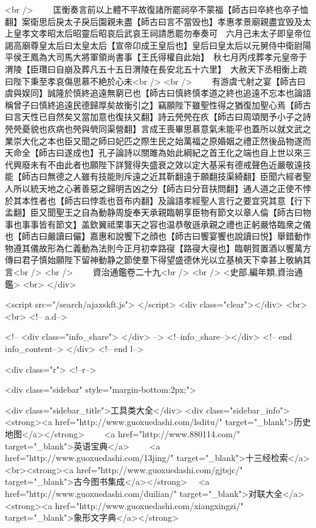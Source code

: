 <br />
　　匡衡奏言前以上體不平故復諸所罷祠卒不蒙福【師古曰卒終也卒子恤翻】案衛思后戾太子戾后園親未盡【師古曰言不當毁也】孝惠孝景廟親盡宜毁及太上皇孝文孝昭太后昭靈后昭哀后武哀王祠請悉罷勿奉奏可　六月己未太子即皇帝位謁高廟尊皇太后曰太皇太后【宣帝卬成王皇后也】皇后曰皇太后以元舅侍中衛尉陽平侯王鳳為大司馬大將軍領尚書事【王氏得權自此始】　秋七月丙戌葬孝元皇帝于渭陵【臣瓚曰自崩及葬凡五十五日渭陵在長安北五十六里】　大赦天下丞相衡上疏曰陛下秉至孝哀傷思慕不絶於心未<br />
<br />
　　有游虞弋射之宴【師古曰虞與娱同】誠隆於慎終追遠無窮已也【師古曰慎終慎孝道之終也追遠不忘本也論語稱曾子曰慎終追遠民德歸厚矣故衡引之】竊願陛下雖聖性得之猶復加聖心焉【師古曰言天性已自然矣又當加意也復扶又翻】詩云焭焭在疚【師古曰周頌閔予小子之詩焭焭憂貌也疚病也焭與煢同渠營翻】言成王喪畢思慕意氣未能平也蓋所以就文武之業崇大化之本也臣又聞之師曰妃匹之際生民之始萬福之原婚姻之禮正然後品物遂而天命全【師古曰遂成也】孔子論詩以關雎為始此綱紀之首王化之端也自上世以來三代興廢未有不由此者也願陛下詳覽得失盛衰之效以定大基采有德戒聲色近嚴敬遠技能【師古曰無德之人雖有技能則斥遠之近其靳翻遠于願翻技渠綺翻】臣聞六經者聖人所以統天地之心著善惡之歸明吉凶之分【師古曰分音扶問翻】通人道之正使不悖於其本性者也【師古曰悖乖也音布内翻】及論語孝經聖人言行之要宜究其意【行下孟翻】臣又聞聖王之自為動静周旋奉天承親臨朝享臣物有節文以章人倫【師古曰物事也事事皆有節文】盖欽翼祗栗事天之容也温恭敬遜承親之禮也正躬嚴恪臨衆之儀也【師古曰嚴讀曰儼】嘉惠和說饗下之顔也【師古曰饗宴饗也說讀曰悦】舉錯動作物遵其儀故形為仁義動為法則今正月初幸路寑【路寑大寑也】臨朝賀置酒以饗萬方傳曰君子慎始願陛下留神動静之節使羣下得望盛德休光以立基楨天下幸甚上敬納其言<br />
<br />
　　資治通鑑卷二十九<br />
<br />
<史部,編年類,資治通鑑>  <br>
   </div> 

<script src="/search/ajaxskft.js"> </script>
 <div class="clear"></div>
<br>
<br>
 <!-- a.d-->

 <!--
<div class="info_share">
</div> 
-->
 <!--info_share--></div>   <!-- end info_content-->
  </div> <!-- end l-->

<div class="r">   <!--r-->



<div class="sidebar"  style="margin-bottom:2px;">

 
<div class="sidebar_title">工具类大全</div>
<div class="sidebar_info">
<strong><a href="http://www.guoxuedashi.com/lsditu/" target="_blank">历史地图</a></strong>　　
<a href="http://www.880114.com/" target="_blank">英语宝典</a>　　
<a href="http://www.guoxuedashi.com/13jing/" target="_blank">十三经检索</a>　
<br><strong><a href="http://www.guoxuedashi.com/gjtsjc/" target="_blank">古今图书集成</a></strong>　
<a href="http://www.guoxuedashi.com/duilian/" target="_blank">对联大全</a>　<strong><a href="http://www.guoxuedashi.com/xiangxingzi/" target="_blank">象形文字典</a></strong>　

